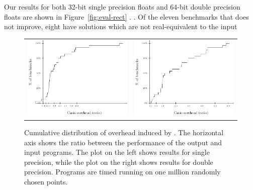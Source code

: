 \documentclass[paper.tex]{subfiles}
\begin{document}
 Our results for both 32-bit single precision floats
and 64-bit double precision floats are shown in
Figure~\ref{fig:eval-rect} .  
. Of the eleven benchmarks that \casio
does not improve, eight have solutions which are not real-equivalent
to the input 

\begin{figure}
  \begin{tabular}{cc}
    \includegraphics[width=0.9\columnwidth]{fig/eval-overhead-f.pdf}
    &
    \includegraphics[width=0.9\columnwidth]{fig/eval-overhead-d.pdf}
  \end{tabular}
  \caption{Cumulative distribution of overhead induced by \casio. The
    horizontal axis shows the ratio between the performance of the
    output and input programs. The plot on the left shows results for
    single precision, while the plot on the right shows results for
    double precision. Programs are timed running on one million
    randomly chosen points.}
  \label{fig:eval-overhead}
\end{figure}
\end{document}

